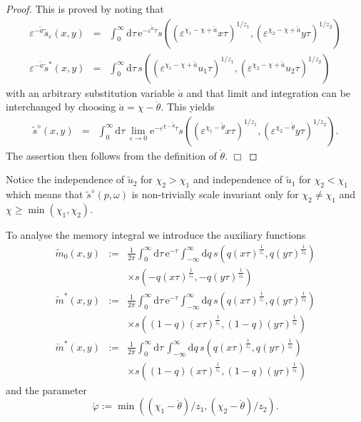 \documentclass[12pt]{article}
\newcommand{\rmd}{\mathrm{d}}
\newcommand{\rme}{\mathrm{e}}
\def\qed{\hfill$\Box$\par\medskip\par\relax}
\begin{document}
\begin{proof}
This is proved by noting that
\begin{eqnarray}
\varepsilon^{-\mathring{a}} \tilde{s}_{\varepsilon}(x,y) 
& = & \int_{0}^\infty \rmd \tau \, 
\rme^{- \varepsilon^{\mathring{a}}\tau} s 
((\varepsilon^{\chi_1-\chi+\mathring{a}} x \tau)^{1/z_1},
(\varepsilon^{\chi_2-\chi+\mathring{a}} y \tau)^{1/z_2}) \\
\varepsilon^{-\mathring{a}} \check{s}^\ast(x,y) 
& = &  \int_{0}^\infty \rmd \tau \, 
s ((\varepsilon^{\chi_1-\chi+\mathring{a}} u_1 \tau)^{1/z_1}, (\varepsilon^{\chi_2-\chi+\mathring{a}} u_2 \tau)^{1/z_2})
\end{eqnarray}
with an arbitrary substitution variable $\mathring{a}$ and that 
limit and integration can be interchanged by choosing 
$\mathring{a}=\chi-\mathring{\theta}$.
This yields
\begin{eqnarray}
\tilde{s}^{\diamond}(x,y) 
& = & 
\int_{0}^\infty \rmd \tau \, \lim_{\varepsilon \to 0} \rme^{- \varepsilon^{\chi-\mathring{\theta}}\tau}
s ((\varepsilon^{\chi_1-\mathring{\theta}} x \tau)^{1/z_1}, (\varepsilon^{\chi_2-\mathring{\theta}} y \tau)^{1/z_2}) .
\end{eqnarray}
The assertion then follows from the definition of $\mathring{\theta}$. \hfill \qed
\end{proof} 
Notice the independence of $\tilde{u}_2$ for $\chi_2>\chi_1$
and independence of $\tilde{u}_1$ for $\chi_2<\chi_1$
which means that $\tilde{s}^{\diamond}(p,\omega)$ is non-trivially
scale invariant
only for $\chi_2 \neq \chi_1$ and $\chi\geq\min{(\chi_1,\chi_2)}$. 

To analyse the memory integral we introduce the auxiliary functions
\begin{eqnarray}
\tilde{m}_{0}(x,y) & := & \frac{1}{2\pi} \int_{0}^{\infty} \rmd \tau \, \rme^{-\tau} 
\int_{- \infty}^{\infty} \rmd q \, 
s(q (x\tau)^{\frac{1}{z_1}}, q (y\tau)^{\frac{1}{z_2}})
\nonumber \\ & & \times
s (- q (x\tau)^{\frac{1}{z_1}}, - q (y\tau)^{\frac{1}{z_2}}) 
\label{tm0} \\
\tilde{m}^\ast(x,y) & := & \frac{1}{2\pi} 
\int_{0}^{\infty} \rmd \tau \, \rme^{-\tau} 
\int_{- \infty}^{\infty} \rmd q \, 
s(q (x\tau)^{\frac{1}{z_1}}, q (y\tau)^{\frac{1}{z_2}})
\nonumber \\ & & \times
s ((1- q) (x\tau)^{\frac{1}{z_1}}, (1- q) (y\tau)^{\frac{1}{z_2}}) 
\label{tmpm} \\
\check{m}^\ast(x,y) & := & \frac{1}{2\pi} 
\int_{0}^{\infty} \rmd \tau \, 
\int_{- \infty}^{\infty} \rmd q \, 
s(q (x\tau)^{\frac{1}{z_1}}, q (y\tau)^{\frac{1}{z_2}})
\nonumber \\ & & \times
s ((1- q) (x\tau)^{\frac{1}{z_1}}, (1- q) (y\tau)^{\frac{1}{z_2}}) 
\label{cmpm}
\end{eqnarray}
and the parameter
\begin{equation}
\mathring{\varphi} := \min{((\chi_1 - \mathring{\theta})/z_1,(\chi_2 - \mathring{\theta})/z_2)}.
\end{equation}
\end{document}
